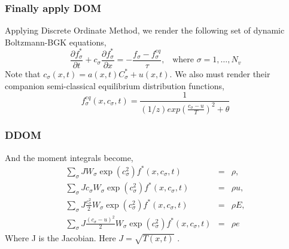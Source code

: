 \begin{frame}
	\frametitle{Finally apply DOM}
	Applying Discrete Ordinate Method, we render the following set of dynamic Boltzmann-BGK equations,
	\begin{equation}
	\frac{\partial {f_\sigma^*}}{\partial t} + c_\sigma \frac{\partial f_\sigma^*}{\partial x} 
		= -\frac{f_\sigma - f_\sigma^{eq}}{\tau}, \;\;\; \text{where } \sigma = 1,\dots,N_v
	\end{equation}
	Note that $c_\sigma(x,t) = a(x,t) C_\sigma^* + u(x,t)$. We also must render their companion semi-classical equilibrium distribution functions,
	\begin{equation}
	f_\sigma^{eq} (x,c_\sigma,t) = \frac{1}{(1/z) exp(\frac{c_\sigma-u}{T})^2 + \theta}
	\end{equation}
\end{frame}

\begin{frame}
	\frametitle{DDOM}
	And the moment integrals become,
	\begin{eqnarray}
		\sum_\sigma J W_\sigma \exp(c_\sigma^2) f^*(x,c_\sigma,t) &=&  \rho, \\
		\sum_\sigma J c_\sigma W_\sigma \exp(c_\sigma^2) f^*(x,c_\sigma,t) &=& \rho u, \nonumber \\
		\sum_\sigma J \frac{c_\sigma^2}{2} W_\sigma \exp(c_\sigma^2) f^*(x,c_\sigma,t) &=& \rho E, \nonumber \\
		\sum_\sigma J \frac{(c_\sigma-u)^2}{2} W_\sigma \exp(c_\sigma^2) f^*(x,c_\sigma,t) &=& \rho e  \nonumber
	\end{eqnarray}
	Where J is the Jacobian. Here $J = \sqrt{T(x,t)}$ .
\end{frame}
